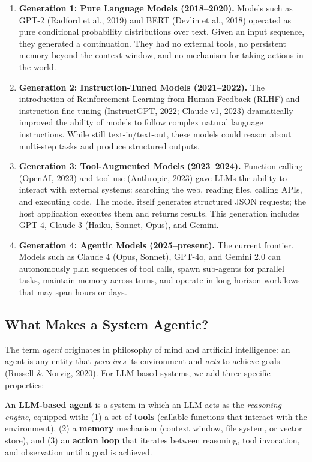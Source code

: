 \documentclass[11pt,letterpaper]{article}
\begin{document}
\begin{enumerate}[leftmargin=*]
    \item \textbf{Generation 1: Pure Language Models (2018--2020).} Models such as GPT-2 (Radford et al., 2019) and BERT (Devlin et al., 2018) operated as pure conditional probability distributions over text. Given an input sequence, they generated a continuation. They had no external tools, no persistent memory beyond the context window, and no mechanism for taking actions in the world.

    \item \textbf{Generation 2: Instruction-Tuned Models (2021--2022).} The introduction of Reinforcement Learning from Human Feedback (RLHF) and instruction fine-tuning (InstructGPT, 2022; Claude v1, 2023) dramatically improved the ability of models to follow complex natural language instructions. While still text-in/text-out, these models could reason about multi-step tasks and produce structured outputs.

    \item \textbf{Generation 3: Tool-Augmented Models (2023--2024).} Function calling (OpenAI, 2023) and tool use (Anthropic, 2023) gave LLMs the ability to interact with external systems: searching the web, reading files, calling APIs, and executing code. The model itself generates structured JSON requests; the host application executes them and returns results. This generation includes GPT-4, Claude 3 (Haiku, Sonnet, Opus), and Gemini.

    \item \textbf{Generation 4: Agentic Models (2025--present).} The current frontier. Models such as Claude 4 (Opus, Sonnet), GPT-4o, and Gemini 2.0 can autonomously plan sequences of tool calls, spawn sub-agents for parallel tasks, maintain memory across turns, and operate in long-horizon workflows that may span hours or days.
\end{enumerate}

\subsection{What Makes a System Agentic?}

The term \emph{agent} originates in philosophy of mind and artificial intelligence: an agent is any entity that \emph{perceives} its environment and \emph{acts} to achieve goals (Russell \& Norvig, 2020). For LLM-based systems, we add three specific properties:

\begin{definitionbox}[title=LLM-based Agent]
An \textbf{LLM-based agent} is a system in which an LLM acts as the \emph{reasoning engine}, equipped with: (1) a set of \textbf{tools} (callable functions that interact with the environment), (2) a \textbf{memory} mechanism (context window, file system, or vector store), and (3) an \textbf{action loop} that iterates between reasoning, tool invocation, and observation until a goal is achieved.
\end{definitionbox}
\end{document}
